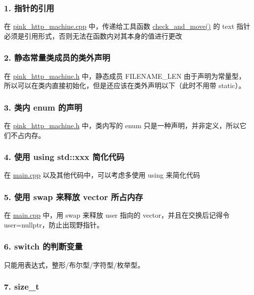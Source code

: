 \subsubsection*{1. 指针的引用}

在 \hyperlink{pink__http__machine_8cpp}{pink\+\_\+http\+\_\+machine.\+cpp} 中，传递给工具函数 \hyperlink{pink__http__machine_8cpp_a9a6484ca3021c09b306a1752e8d2f2d7}{check\+\_\+and\+\_\+move()} 的 text 指针必须是引用形式，否则无法在函数内对其本身的值进行更改

\subsubsection*{2. 静态常量类成员的类外声明}

在 \hyperlink{pink__http__machine_8h}{pink\+\_\+http\+\_\+machine.\+h} 中，静态成员 F\+I\+L\+E\+N\+A\+M\+E\+\_\+\+L\+EN 由于声明为常量型，所以可以在类内直接初始化，但是还应该在类外声明以下（此时不用带 static）。

\subsubsection*{3. 类内 enum 的声明}

在 \hyperlink{pink__http__machine_8h}{pink\+\_\+http\+\_\+machine.\+h} 中，类内写的 enum 只是一种声明，并非定义，所以它们不占内存。

\subsubsection*{4. 使用 using std\+::xxx 简化代码}

在 \hyperlink{main_8cpp}{main.\+cpp} 以及其他代码中，可以考虑多使用 using 来简化代码

\subsubsection*{5. 使用 swap 来释放 vector 所占内存}

在 \hyperlink{main_8cpp}{main.\+cpp} 中，用 swap 来释放 user 指向的 vector，并且在交换后记得令 user=nullptr，防止出现野指针。

\subsubsection*{6. switch 的判断变量}

只能用表达式，整形/布尔型/字符型/枚举型。

\subsubsection*{7. size\+\_\+t}


